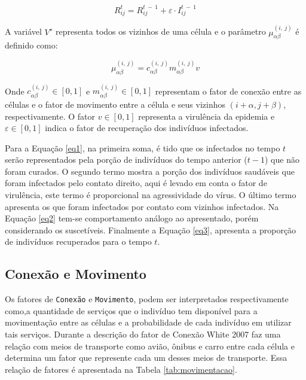\documentclass[a4paper,12pt]{article}
\begin{document}
\begin{equation} 
R_{ij}^t=R_{ij}^{t\:-\:1}+\varepsilon \cdot I_{ij}^{t\:-\:1}
\label{eq3}
\end{equation}

A variável $V^\star$ representa todos os vizinhos de uma célula e o parâmetro $\mu_{\alpha \beta}^{\left(i,\:j\right)}$ é definido como:

\begin{equation}
\mu_{\alpha \beta}^{\left(i,\:j\right)} = c_{\alpha\beta}^{\left(i,\:j\right)} m_{\alpha \beta}^{\left(i,\:j\right)}v
\end{equation}

Onde $c_{\alpha \beta}^{\left(i,\:j\right)} \in [0, 1]$ e $ m_{\alpha \beta}^{\left(i,\:j\right)} \in [0, 1]$ representam o fator de conexão entre as células e o fator de movimento entre a célula e seus vizinhos $(i + \alpha, j + \beta)$, respectivamente. O fator $v \in [0, 1]$ representa a virulência da epidemia e $\varepsilon \in [0, 1]$ indica o fator de recuperação dos indivíduos infectados.

Para a Equação \ref{eq1}, na primeira soma, é tido que os infectados no tempo $t$ serão representados pela porção de indivíduos do tempo anterior ($t-1$) que não foram curados. O segundo termo mostra a porção dos indivíduos saudáveis que foram infectados pelo contato direito, aqui é levado em conta o fator de virulência, este termo é proporcional na agressividade do vírus. O último termo apresenta os que foram infectados por contato com vizinhos infectados. Na Equação \ref{eq2} tem-se comportamento análogo ao apresentado, porém considerando os suscetíveis. Finalmente a Equação \ref{eq3}, apresenta a proporção de indivíduos recuperados para o tempo $t$.

\subsection{Conexão e Movimento}

Os fatores de \texttt{Conexão} e \texttt{Movimento}, podem ser interpretados respectivamente como,a quantidade de serviços que o indivíduo tem disponível para a movimentação entre as células e a probabilidade de cada indivíduo em utilizar tais serviços. Durante a descrição do fator de Conexão White 2007 \cite{White2007} faz uma relação com meios de transporte como avião, ônibus e carro entre cada célula e determina um fator que represente cada um desses meios de transporte. Essa relação de fatores é apresentada na Tabela \ref{tab:movimentacao}. 
\end{document}
